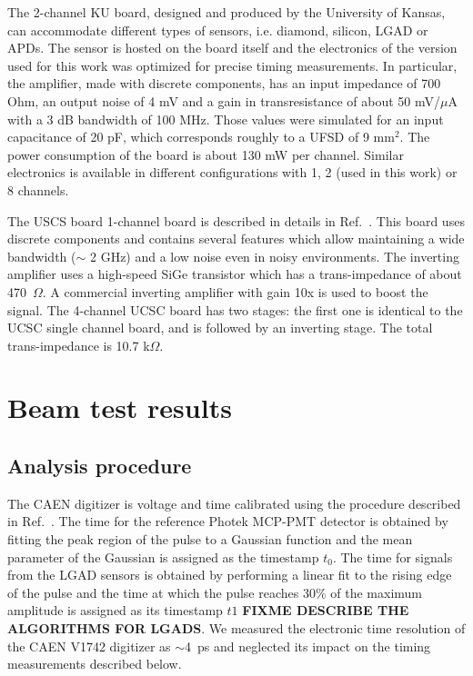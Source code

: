 \documentclass[preprint,1p]{elsarticle}
\begin{document}
The 2-channel KU board, designed and produced by the University of Kansas, can
accommodate different types of sensors, i.e. diamond, silicon, LGAD or APDs. The
sensor is hosted on the board itself and the electronics of the version used for
this work was optimized for precise timing measurements. In particular, the
amplifier, made with discrete components, has an input impedance of 700 Ohm, an
output noise of 4 mV and a gain in transresistance of about 50 mV/$\mu$A with
a 3 dB bandwidth of 100 MHz. Those values were simulated for an input
capacitance of 20 pF, which corresponds roughly to a UFSD of 9 mm$^2$. The power
consumption of the board is about 130 mW per channel. Similar electronics is
available in different configurations with 1, 2 (used in this work) or 8
channels.

The USCS board 1-channel board is described in details in
Ref.~\cite{Cartiglia201783}. This board uses discrete components and contains
several features which allow maintaining a wide bandwidth ($\sim$ 2 GHz) and a
low noise even in noisy environments. The inverting amplifier uses a high-speed
SiGe transistor which has a trans-impedance of about 470~$\Omega$. A commercial
inverting amplifier with gain 10x is used to boost the signal. The 4-channel
UCSC board has two stages: the first one is identical to the UCSC single channel
board, and is followed by an inverting stage. The total trans-impedance is 10.7
k$\Omega$.



\section{Beam test results}
\label{sec:results}

\subsection{Analysis procedure}

The CAEN digitizer is voltage and time calibrated using the procedure described
in Ref.~\cite{Kim201467}. The time for the reference Photek MCP-PMT detector is
obtained by fitting the peak region of the pulse to a Gaussian function and the
mean parameter of the Gaussian is assigned as the timestamp $t_0$. The time for
signals from the LGAD sensors is obtained by performing a linear fit to the
rising edge of the pulse and the time at which the pulse reaches 30\% of the
maximum amplitude is assigned as its timestamp $t1$ \textbf{FIXME DESCRIBE THE
ALGORITHMS FOR LGADS}. We measured the electronic time resolution of the CAEN
V1742 digitizer as $\sim$4~ps and neglected its impact on the timing
measurements described below. 
\end{document}

